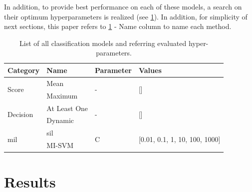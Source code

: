 \documentclass[journal,article,submit,moreauthors,pdftex, applsci]{Definitions/mdpi}
\begin{document}
In addition, to provide best performance on each of these models, a search on their optimum hyperparameters is realized (see \cref{tab:patient_hyperparameters}). In addition, for simplicity of next sections, this paper refers to \cref{tab:patient_hyperparameters} - Name column to name each method.\par
\begin{table}[]
    \centering
    \begin{tabular}{llll}
    \textbf{Category}               & \textbf{Name}     & \textbf{Parameter}& \textbf{Values}                                   \\ \hline
    \multirow{2}{*}{Score}          & Mean              & \multirow{2}{*}{-}& \multirow{2}{*}{[]}                               \\ \cline{2-2}
                                    & Maximum           &                   &                                                   \\ \hline 
    \multirow{2}{*}{Decision}       & At Least One      & \multirow{2}{*}{-}& \multirow{2}{*}{[]}                               \\ \cline{2-2}
                                    & Dynamic           &                   &                                                   \\ \hline 
    \multirow{2}{*}{\ac{mil}}       & \ac{sil}          & \multirow{2}{*}{C}& \multirow{2}{*}{[0.01, 0.1, 1, 10, 100, 1000]}    \\ \cline{2-2}
                                    & MI-SVM            &                   &                                                   \\ \hline 
    \end{tabular}    
    \caption{List of all classification models and referring evaluated hyper-parameters.}
    \label{tab:patient_hyperparameters}
\end{table}
\par


\section{Results}
\label{sec:results}
\end{document}
